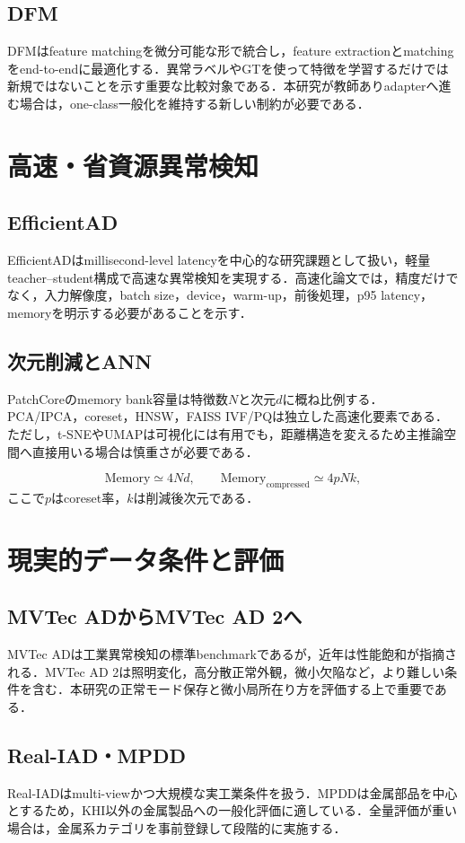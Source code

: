 \documentclass[a4paper,11pt]{ltjsarticle}
\begin{document}
\subsection{DFM}
DFMはfeature matchingを微分可能な形で統合し，feature extractionとmatchingをend-to-endに最適化する．異常ラベルやGTを使って特徴を学習するだけでは新規ではないことを示す重要な比較対象である．本研究が教師ありadapterへ進む場合は，one-class一般化を維持する新しい制約が必要である．

\section{高速・省資源異常検知}
\subsection{EfficientAD}
EfficientADはmillisecond-level latencyを中心的な研究課題として扱い，軽量teacher--student構成で高速な異常検知を実現する．高速化論文では，精度だけでなく，入力解像度，batch size，device，warm-up，前後処理，p95 latency，memoryを明示する必要があることを示す．

\subsection{次元削減とANN}
PatchCoreのmemory bank容量は特徴数$N$と次元$d$に概ね比例する．PCA/IPCA，coreset，HNSW，FAISS IVF/PQは独立した高速化要素である．ただし，t-SNEやUMAPは可視化には有用でも，距離構造を変えるため主推論空間へ直接用いる場合は慎重さが必要である．

\begin{equation}
\mathrm{Memory}\simeq 4Nd,\qquad
\mathrm{Memory}_{\mathrm{compressed}}\simeq 4pNk,
\end{equation}
ここで$p$はcoreset率，$k$は削減後次元である．

\section{現実的データ条件と評価}
\subsection{MVTec ADからMVTec AD 2へ}
MVTec ADは工業異常検知の標準benchmarkであるが，近年は性能飽和が指摘される．MVTec AD 2は照明変化，高分散正常外観，微小欠陥など，より難しい条件を含む．本研究の正常モード保存と微小局所在り方を評価する上で重要である．

\subsection{Real-IAD・MPDD}
Real-IADはmulti-viewかつ大規模な実工業条件を扱う．MPDDは金属部品を中心とするため，KHI以外の金属製品への一般化評価に適している．全量評価が重い場合は，金属系カテゴリを事前登録して段階的に実施する．
\end{document}
